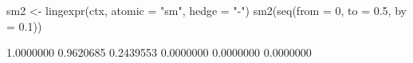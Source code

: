 \begin{Schunk}
% --begin: "emptyhedge2"
\begin{Sinput}
 sm2 <- lingexpr(ctx, atomic = "sm", hedge = "-")
 sm2(seq(from = 0, to = 0.5, by = 0.1))
\end{Sinput}
\begin{Soutput}
[1] 1.0000000 0.9620685 0.2439553 0.0000000 0.0000000 0.0000000
\end{Soutput}
%
% --end: "emptyhedge2"
\end{Schunk}
